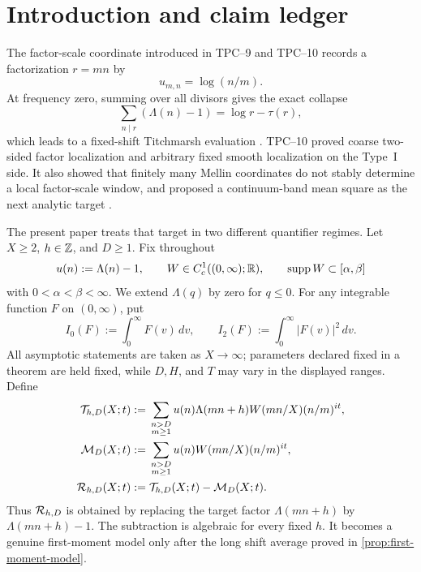 \section{Introduction and claim ledger}
\label{sec:introduction}

The factor-scale coordinate introduced in TPC--9 and TPC--10 records a
factorization $r=mn$ by
\[
 u_{m,n}=\log(n/m).
\]
At frequency zero, summing over all divisors gives the exact collapse
\[
 \sum_{n\mid r}(\Lambda(n)-1)=\log r-\tau(r),
\]
which leads to a fixed-shift Titchmarsh evaluation
\citep{AssingBlomerLi2021,WangTPC9}.  TPC--10 proved coarse two-sided
factor localization and arbitrary fixed smooth localization on the Type~I
side.  It also showed that finitely many Mellin coordinates do not stably
determine a local factor-scale window, and proposed a continuum-band mean
square as the next analytic target \citep{WangTPC10}.

The present paper treats that target in two different quantifier regimes.
Let $X\geq2$, $h\in\mathbb Z$, and $D\geq1$.  Fix throughout
\begin{equation}
 u(n):=\Lambda(n)-1,
 \qquad W\in C_c^1((0,\infty);\mathbb R),
 \qquad \operatorname{supp} W\subset[\alpha,\beta]
 \label{eq:intro-basic-data}
\end{equation}
with $0<\alpha<\beta<\infty$.  We extend $\Lambda(q)$ by zero for
$q\leq0$.  For any integrable function $F$ on $(0,\infty)$, put
\begin{equation}
 I_0(F):=\int_0^\infty F(v)\,dv,
 \qquad
 I_2(F):=\int_0^\infty |F(v)|^2\,dv.
 \label{eq:moment-functionals}
\end{equation}
All asymptotic statements are taken as $X\to\infty$; parameters declared
fixed in a theorem are held fixed, while $D,H$, and $T$ may vary in the
displayed ranges.
Define
\begin{align}
 \mathcal T_{h,D}(X;t)
 &:={}
 \sum_{\substack{n>D\\m\geq1}}
 u(n)\Lambda(mn+h)W(mn/X)(n/m)^{it},
 \label{eq:intro-raw-tail}\\
 \mathcal M_D(X;t)
 &:={}
 \sum_{\substack{n>D\\m\geq1}}
 u(n)W(mn/X)(n/m)^{it},
 \label{eq:intro-source-model}\\
 \mathcal R_{h,D}(X;t)
 &:={}\mathcal T_{h,D}(X;t)-\mathcal M_D(X;t).
 \label{eq:intro-centered-tail}
\end{align}
Thus $\mathcal R_{h,D}$ is obtained by replacing the target factor
$\Lambda(mn+h)$ by $\Lambda(mn+h)-1$.  The subtraction is algebraic for
every fixed $h$.  It becomes a genuine first-moment model only after the
long shift average proved in \cref{prop:first-moment-model}.

